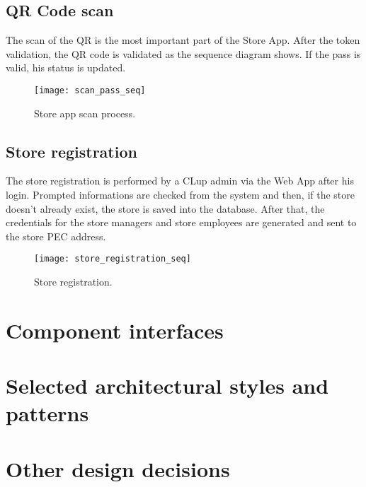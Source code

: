 \subsection{QR Code scan}
The scan of the QR is the most important part of the Store App. After the token validation, the QR code is validated as the sequence diagram shows. If the pass is valid, his status is updated.
\begin{figure}[H]
	\centering
	\texttt{[image: scan\_pass\_seq]}
	\caption{Store app scan process.}
	\label{fig:scan_pass_seq}
\end{figure}

\subsection{Store registration}
The store registration is performed by a CLup admin via the Web App after his login. Prompted informations are checked from the system and then, if the store doesn't already exist, the store is saved into the database. After that, the credentials for the store managers and store employees are generated and sent to the store PEC address.
\begin{figure}[H]
	\centering
	\texttt{[image: store\_registration\_seq]}
	\caption{Store registration.}
	\label{fig:store_registration_seq}
\end{figure}

\section{Component interfaces}

\section{Selected architectural styles and patterns}

\section{Other design decisions}
